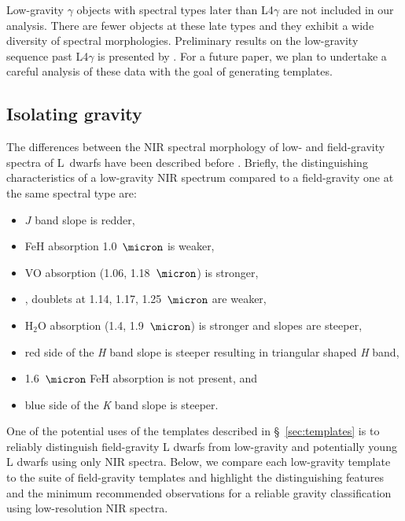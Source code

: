 \documentclass[modern,trackchanges]{aastex61}
\begin{document}
Low-gravity $\gamma$ objects with spectral types later than L4$\gamma$ are not included in our analysis.
There are fewer objects at these late types and they exhibit a wide diversity of spectral morphologies.
Preliminary results on the low-gravity sequence past L4$\gamma$ is presented by \cite{Gagne:2015dc}.
For a future paper, we plan to undertake a careful analysis of these data with the goal of generating templates.

\subsection{Isolating gravity}

The differences between the NIR spectral morphology of low- and field-gravity spectra of L~dwarfs have been described before \citep{Lucas01,McGovern04,Kirkpatrick06,Allers:2013hk}. Briefly, the distinguishing characteristics of a low-gravity NIR spectrum compared to a field-gravity one at the same spectral type are:
\begin{itemize}
\item $J$ band slope is redder,
\item FeH absorption 1.0~$\micron$ is weaker,
\item VO absorption (1.06, 1.18~$\micron$) is stronger,
\item {},  doublets at 1.14, 1.17, 1.25~$\micron$ are weaker,
\item H$_2$O absorption (1.4, 1.9~$\micron$) is stronger and slopes are steeper,
\item red side of the \emph{H} band slope is steeper resulting in triangular shaped \emph{H} band,
\item 1.6~$\micron$ FeH absorption is not present, and
\item blue side of the \emph{K} band slope is steeper.
\end{itemize}

One of the potential uses of the templates described in \S~\ref{sec:templates} is to reliably distinguish field-gravity L dwarfs from low-gravity and potentially young L dwarfs using only NIR spectra.
Below, we compare each low-gravity template to the suite of field-gravity templates and highlight the distinguishing features and the minimum recommended observations for a reliable gravity classification using low-resolution NIR spectra.
\end{document}

